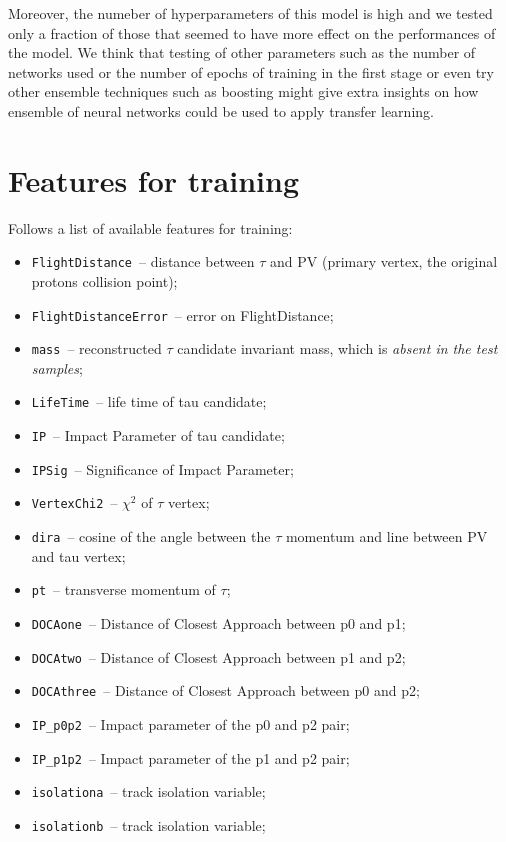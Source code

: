 \documentclass[conference]{IEEEtran}
\begin{document}
Moreover, the numeber of hyperparameters of this model is high and we tested
only a fraction of those that seemed to have more effect on the performances of
the model. We think that testing of other parameters such as the number of
networks used or the number of epochs of training in the first stage or even try
other ensemble techniques such as boosting might give extra insights on how
ensemble of neural networks could be used to apply transfer learning.


\clearpage
\appendix

\section{Features for training}
\label{sec:features}
Follows a list of available features for training:
\begin{itemize}
	\item \texttt{FlightDistance}~-- distance between $\tau$ and PV (primary vertex, the
	original protons collision point);
	\item \texttt{FlightDistanceError}~-- error on FlightDistance;
	\item \texttt{mass}~-- reconstructed $\tau$ candidate invariant mass, which
	is \textit{absent in the test samples};
	\item \texttt{LifeTime}~-- life time of tau candidate;
	\item \texttt{IP}~-- Impact Parameter of tau candidate;
	\item \texttt{IPSig}~-- Significance of Impact Parameter;
	\item \texttt{VertexChi2}~-- $\chi^2$ of $\tau$ vertex;
	\item \texttt{dira}~-- cosine of the angle between the $\tau$ momentum and line
	between PV and tau vertex;
	\item \texttt{pt}~-- transverse momentum of $\tau$;
	\item \texttt{DOCAone}~-- Distance of Closest Approach between p0 and p1;
	\item \texttt{DOCAtwo}~-- Distance of Closest Approach between p1 and p2;
	\item \texttt{DOCAthree}~-- Distance of Closest Approach between p0 and p2;
	\item \texttt{IP\_p0p2}~-- Impact parameter of the p0 and p2 pair;
	\item \texttt{IP\_p1p2}~-- Impact parameter of the p1 and p2 pair;
	\item \texttt{isolationa}~-- track isolation variable;
	\item \texttt{isolationb}~-- track isolation variable;

\end{itemize}
\end{document}
